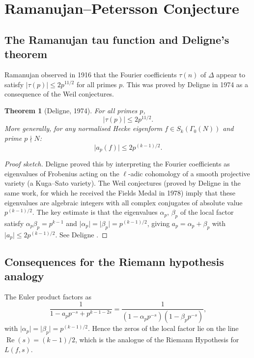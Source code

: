 \documentclass[12pt,a4paper]{amsart}
\newtheorem{theorem}{Theorem}[section]
\theoremstyle{definition}
\begin{document}
\section{Ramanujan--Petersson Conjecture}\label{sec:ramanujan}

\subsection{The Ramanujan tau function and Deligne's theorem}

Ramanujan observed in 1916 that the Fourier coefficients $\tau(n)$ of $\Delta$
appear to satisfy $\lvert \tau(p) \rvert \le 2p^{11/2}$ for all primes $p$.
This was proved by Deligne in 1974 as a consequence of the Weil conjectures.

\begin{theorem}[Deligne, 1974]\label{thm:deligne}
  For all primes $p$,
  \[
    \lvert \tau(p) \rvert \le 2p^{11/2}.
  \]
  More generally, for any normalised Hecke eigenform $f \in S_k(\Gamma_0(N))$
  and prime $p \nmid N$:
  \[
    \lvert a_p(f) \rvert \le 2p^{(k-1)/2}.
  \]
\end{theorem}

\begin{proof}[Proof sketch]
  Deligne proved this by interpreting the Fourier coefficients as eigenvalues
  of Frobenius acting on the $\ell$-adic cohomology of a smooth projective variety
  (a Kuga--Sato variety). The Weil conjectures (proved by Deligne in the same work,
  for which he received the Fields Medal in 1978) imply that these eigenvalues are
  algebraic integers with all complex conjugates of absolute value $p^{(k-1)/2}$.
  The key estimate is that the eigenvalues $\alpha_p$, $\beta_p$ of the local
  factor satisfy $\alpha_p \beta_p = p^{k-1}$ and $\lvert\alpha_p\rvert = \lvert\beta_p\rvert = p^{(k-1)/2}$,
  giving $a_p = \alpha_p + \beta_p$ with $\lvert a_p \rvert \le 2p^{(k-1)/2}$.
  See Deligne \cite{Deligne74}.
\end{proof}

\subsection{Consequences for the Riemann hypothesis analogy}

The Euler product factors as
\[
  \frac{1}{1 - a_p p^{-s} + p^{k-1-2s}} = \frac{1}{(1-\alpha_p p^{-s})(1-\beta_p p^{-s})},
\]
with $\lvert\alpha_p\rvert = \lvert\beta_p\rvert = p^{(k-1)/2}$. Hence the
zeros of the local factor lie on the line $\operatorname{Re}(s) = (k-1)/2$,
which is the analogue of the Riemann Hypothesis for $L(f,s)$.
\end{document}
